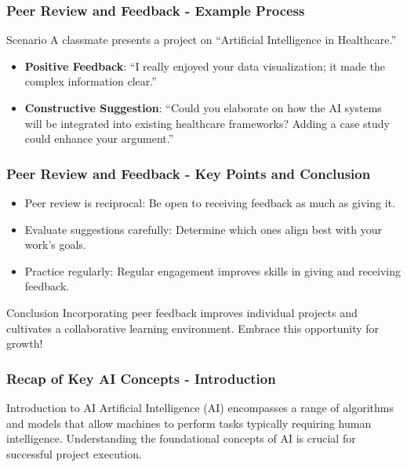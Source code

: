 \documentclass[aspectratio=169]{beamer}
\begin{document}
\begin{frame}[fragile]
    \frametitle{Peer Review and Feedback - Example Process}
    \begin{block}{Scenario}
        A classmate presents a project on ``Artificial Intelligence in Healthcare.''
    \end{block}
    \begin{itemize}
        \item \textbf{Positive Feedback}: ``I really enjoyed your data visualization; it made the complex information clear.''
        \item \textbf{Constructive Suggestion}: ``Could you elaborate on how the AI systems will be integrated into existing healthcare frameworks? Adding a case study could enhance your argument.''
    \end{itemize}
\end{frame}

\begin{frame}[fragile]
    \frametitle{Peer Review and Feedback - Key Points and Conclusion}
    \begin{itemize}
        \item Peer review is reciprocal: Be open to receiving feedback as much as giving it.
        \item Evaluate suggestions carefully: Determine which ones align best with your work's goals.
        \item Practice regularly: Regular engagement improves skills in giving and receiving feedback.
    \end{itemize}
    
    \begin{block}{Conclusion}
        Incorporating peer feedback improves individual projects and cultivates a collaborative learning environment. Embrace this opportunity for growth!
    \end{block}
\end{frame}

\begin{frame}[fragile]
    \frametitle{Recap of Key AI Concepts - Introduction}
    \begin{block}{Introduction to AI}
        Artificial Intelligence (AI) encompasses a range of algorithms and models that allow machines to perform tasks typically requiring human intelligence. 
        Understanding the foundational concepts of AI is crucial for successful project execution.
    \end{block}
\end{frame}
\end{document}
